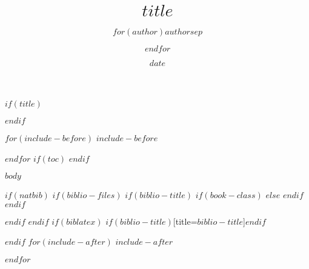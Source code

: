\documentclass[10,$if(lang)$$lang$,$endif$letterpaper,]{$documentclass$}
\title{$title$}
\author{$for(author)$$author$$sep$ \and $endfor$}
\date{$date$}
\begin{document}
$if(title)$
\maketitle
$endif$

$for(include-before)$
$include-before$

$endfor$
$if(toc)$
{
\hypersetup{linkcolor=black}
\tableofcontents
}
$endif$

\raggedright
$body$

$if(natbib)$
$if(biblio-files)$
$if(biblio-title)$
$if(book-class)$
\renewcommand\bibname{$biblio-title$}
$else$
\renewcommand\refname{$biblio-title$}
$endif$
$endif$


$endif$
$endif$
$if(biblatex)$
\printbibliography$if(biblio-title)$[title=$biblio-title$]$endif$

$endif$
$for(include-after)$
$include-after$

$endfor$
\end{document}
